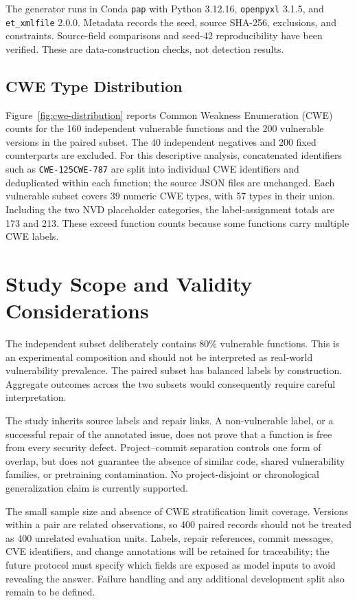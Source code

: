\documentclass[conference]{IEEEtran}
\begin{document}
The generator  runs in Conda \texttt{pap} with Python 3.12.16, \texttt{openpyxl} 3.1.5, and \texttt{et\_xmlfile} 2.0.0. Metadata records the seed, source SHA-256, exclusions, and constraints. Source-field comparisons and seed-42 reproducibility have been verified. These are data-construction checks, not detection results.

\subsection{CWE Type Distribution}
Figure~\ref{fig:cwe-distribution} reports Common Weakness Enumeration (CWE) counts for the 160 independent vulnerable functions and the 200 vulnerable versions in the paired subset. The 40 independent negatives and 200 fixed counterparts are excluded. For this descriptive analysis, concatenated identifiers such as \texttt{CWE-125CWE-787} are split into individual CWE identifiers and deduplicated within each function; the source JSON files are unchanged. Each vulnerable subset covers 39 numeric CWE types, with 57 types in their union. Including the two NVD placeholder categories, the label-assignment totals are 173 and 213. These exceed function counts because some functions carry multiple CWE labels.

\section{Study Scope and Validity Considerations}
The independent subset deliberately contains 80\% vulnerable functions. This is an experimental composition and should not be interpreted as real-world vulnerability prevalence. The paired subset has balanced labels by construction. Aggregate outcomes across the two subsets would consequently require careful interpretation.

The study inherits source labels and repair links. A non-vulnerable label, or a successful repair of the annotated issue, does not prove that a function is free from every security defect. Project--commit separation controls one form of overlap, but does not guarantee the absence of similar code, shared vulnerability families, or pretraining contamination. No project-disjoint or chronological generalization claim is currently supported.

The small sample size and absence of CWE stratification limit coverage. Versions within a pair are related observations, so 400 paired records should not be treated as 400 unrelated evaluation units. Labels, repair references, commit messages, CVE identifiers, and change annotations will be retained for traceability; the future protocol must specify which fields are exposed as model inputs to avoid revealing the answer. Failure handling and any additional development split also remain to be defined.
\end{document}
